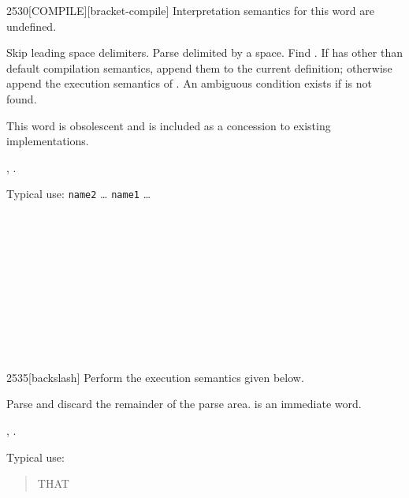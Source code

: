 \begin{worddef}{2530}{[COMPILE]}[bracket-compile]
\interpret
	Interpretation semantics for this word are undefined.

\compile

	Skip leading space delimiters. Parse  delimited by
	a space. Find . If  has other than default
	compilation semantics, append them to the current definition;
	otherwise append the execution semantics of . An
	ambiguous condition exists if  is not found.

\note This word is obsolescent and is included as a concession to
	existing implementations.

\see {},
	.

	\begin{rationale} %
		Typical use:
			\word{:} \texttt{name2} {\ldots}
				\word{[COMPILE]} \texttt{name1}
			{\ldots} \word{;} ~ 
	\end{rationale}

	\begin{testing}
		 \\
		 \\

		 \\
		\test{\word{:} [c2] \word{[COMPILE]} [c1] \word{;}}{} \\

		 \\
		 \\
		 \\
		 \\
	\end{testing}
\end{worddef}


\begin{worddef}[bs]{2535}{\bs}[backslash]
\compile
	Perform the execution semantics given below.

\execute

	Parse and discard the remainder of the parse area.
	 is an immediate word.

\see {},
	.

	\begin{rationale} %
		Typical use:
		\begin{quote}  THAT
			~  ~ 
		\end{quote}
	\end{rationale}
\end{worddef}
